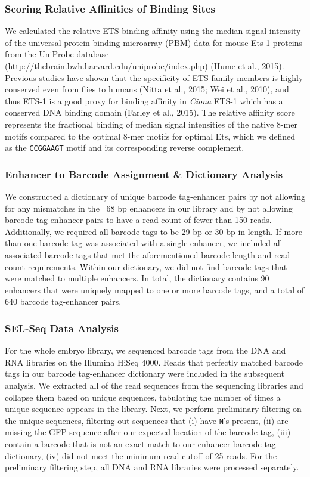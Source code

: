 \subsubsection{Scoring Relative Affinities of Binding Sites}
We calculated the relative ETS binding affinity using the median signal intensity of the universal protein binding microarray (PBM) data for mouse Ets-1 proteins from the UniProbe database (\href{http://thebrain.bwh.harvard.edu/uniprobe/index.php}{http://thebrain.bwh.harvard.edu/uniprobe/index.php}) (Hume et al., 2015). Previous studies have shown that the specificity of ETS family members is highly conserved even from flies to humans (Nitta et al., 2015; Wei et al., 2010), and thus ETS-1 is a good proxy for binding affinity in \textit{Ciona} ETS-1 which has a conserved DNA binding domain (Farley et al., 2015). The relative affinity score represents the fractional binding of median signal intensities of the native 8-mer motifs compared to the optimal 8-mer motifs for optimal Ets, which we defined as the \verb|CCGGAAGT| motif and its corresponding reverse complement.  

\subsubsection{Enhancer to Barcode Assignment \& Dictionary Analysis}
We constructed a dictionary of unique barcode tag-enhancer pairs by not allowing for any mismatches in the ~68 bp enhancers in our library and by not allowing barcode tag-enhancer pairs to have a read count of fewer than 150 reads. Additionally, we required all barcode tags to be 29 bp or 30 bp in length. If more than one barcode tag was associated with a single enhancer, we included all associated barcode tags that met the aforementioned barcode length and read count requirements. Within our dictionary, we did not find barcode tags that were matched to multiple enhancers. In total, the dictionary contains 90 enhancers that were uniquely mapped to one or more barcode tags, and a total of 640 barcode tag-enhancer pairs.

\subsubsection{SEL-Seq Data Analysis}
For the whole embryo library, we sequenced barcode tags from the DNA and RNA libraries on the Illumina HiSeq 4000. Reads that perfectly matched barcode tags in our barcode tag-enhancer dictionary were included in the subsequent analysis. We extracted all of the read sequences from the sequencing libraries and collapse them based on unique sequences, tabulating the number of times a unique sequence appears in the library. Next, we perform preliminary filtering on the unique sequences, filtering out sequences that (i) have \verb|N|’s present, (ii) are missing the GFP sequence after our expected location of the barcode tag, (iii) contain a barcode that is not an exact match to our enhancer-barcode tag dictionary, (iv) did not meet the minimum read cutoff of 25 reads. For the preliminary filtering step, all DNA and RNA libraries were processed separately. 

